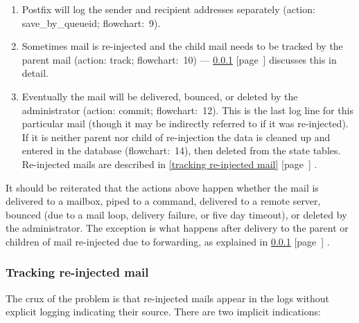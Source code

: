 \documentclass[a4paper,12pt,draft]{article}
\newcommand{\refwithpage}[1]{%
    \empty{}\ref{#1} [page~\pageref{#1}]%
}
\newcommand{\sectionref}[1]{%
    \textsection{}\refwithpage{#1}%
}
\begin{document}
\begin{enumerate}

    \item Postfix will log the sender and recipient addresses separately
        (action: save\_by\_queueid; flowchart:~9).

    \item Sometimes mail is re-injected and the child mail needs to be
        tracked by the parent mail (action: track; flowchart:~10) ---
        \sectionref{tracking re-injected mail} discusses this in
        detail.

    \item Eventually the mail will be delivered, bounced, or deleted by the
        administrator (action: commit; flowchart:~12).  This is the last
        log line for this particular mail (though it may be indirectly
        referred to if it was re-injected).  If it is neither parent nor
        child of re-injection the data is cleaned up and entered in the
        database (flowchart:~14), then deleted from the state tables.
        Re-injected mails are described in \sectionref{tracking re-injected
        mail}.

\end{enumerate}

It should be reiterated that the actions above happen whether the mail is
delivered to a mailbox, piped to a command, delivered to a remote server,
bounced (due to a mail loop, delivery failure, or five day timeout), or
deleted by the administrator.  The exception is what happens after delivery
to the parent or children of mail re-injected due to forwarding, as
explained in \sectionref{tracking re-injected mail}.

\subsubsection{Tracking re-injected mail}

\label{tracking re-injected mail}

The crux of the problem is that re-injected mails appear in the logs
without explicit logging indicating their source.  There are two implicit
indications:
\end{document}
